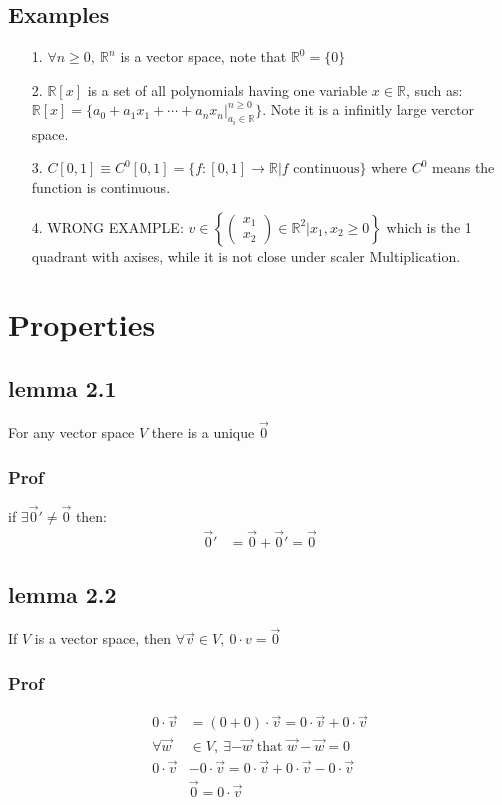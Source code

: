 \documentclass{article}
\begin{document}
\subsection*{Examples}
\begin{itemize}
    \item [1.] \(\forall n \geq 0,\ \mathbb{R}^n\) is a vector space, note that \(\mathbb{R}^0=\{0\}\)
    \item [2.] \(\mathbb{R}[x]\) is a set of all polynomials having one variable \(x\in\mathbb{R}\), such as: \(\mathbb{R}[x]=\{a_0+a_1x_1+\cdots+a_nx_n|^{n\geq0}_{a_i\in\mathbb{R}}\}\). Note it is a infinitly large verctor space.
    \item [3.] \(C[0,1]\equiv C^0[0,1]=\{f:[0,1]\rightarrow\mathbb{R}|f\text{ continuous}\}\) where \(C^0\) means the function is continuous.
    \item [4.] WRONG EXAMPLE: \(v\in \left\{ \begin{pmatrix}x_1\\x_2\end{pmatrix}\in\mathbb{R}^2\left|x_1,x_2\geq0\right.\right\}\) which is the 1 quadrant with axises, while it is not close under scaler Multiplication.
\end{itemize}
\section*{Properties}
\subsection*{lemma 2.1}
For any vector space \(V\) there is a unique \(\overrightarrow{0}\)
\subsubsection*{Prof}
if \(\exists \overrightarrow{0}'\neq \overrightarrow{0}\) then:
\begin{align*}
    \overrightarrow{0}' &=\overrightarrow{0}+\overrightarrow{0}' =\overrightarrow{0}
\end{align*}
\subsection*{lemma 2.2}
If \(V\) is a vector space, then \(\forall \overrightarrow{v} \in V, \ 0\cdot v = \overrightarrow{0}\)
\subsubsection*{Prof}
\begin{align*}
    0\cdot \overrightarrow{v}&=(0+0)\cdot \overrightarrow{v}=0\cdot  \overrightarrow{v}+0\cdot \overrightarrow{v}\\
    \forall \overrightarrow{w}&\in V,\ \exists -\overrightarrow{w} \text{ that } \overrightarrow{w}-\overrightarrow{w}=0\\
    0\cdot  \overrightarrow{v}&-0\cdot  \overrightarrow{v}=0\cdot  \overrightarrow{v}+0\cdot \overrightarrow{v}-0\cdot  \overrightarrow{v}\\
    &\overrightarrow{0}=0\cdot\overrightarrow{v}
\end{align*}
\newpage
\end{document}
